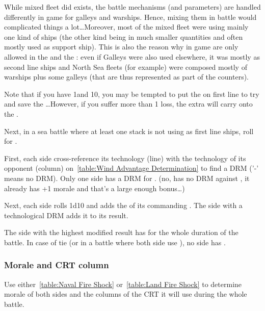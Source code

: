\begin{designnote}
  While mixed fleet did exists, the battle mechanisms (and parameters) are
  handled differently in game for galleys and warships. Hence, mixing them in
  battle would complicated things a lot\ldots Moreover, most of the mixed
  fleet were using mainly one kind of ships (the other kind being in much
  smaller quantities and often mostly used as support ship). This is also the
  reason why in game \NGD are only allowed in the  and
  the : even if Galleys were also used elsewhere, it was
  mostly as second line ships and North Sea fleets (for example) were composed
  mostly of warships plus some galleys (that are thus represented as part of
  the counters).

  \smallskip

  Note that if you have 1\NWD and 10\NGD, you may be tempted to put the \NWD
  on first line to try and save the \NGD\ldots However, if you suffer more
  than 1 loss, the extra will carry onto the \NGD.
\end{designnote}

Next, in a sea battle where at least one stack is not using \NGD as first line
ships, roll for .


First, each side cross-reference its technology (line) with the technology of
its opponent (column) on~\ref{table:Wind Advantage Determination} to find a
DRM ('-' means no DRM). Only one side has a DRM for .
(no, \TBAT has no DRM against \TGF, it already has +1 morale and that's a
large enough bonus\ldots)

Next, each side rolls 1d10 and adds the \Man of its commanding \LeaderA. The
side with a technological DRM adds it to its result.

The side with the highest modified result has  for the
whole duration of the battle. In case of tie (or in a battle where both side
use \NGD), no side has .

\subsubsection{Morale and CRT column}
\label{chMilitary:Battle:Parameters:CRT}
Use either~\ref{table:Naval Fire Shock} or~\ref{table:Land Fire Shock} to
determine morale of both sides and the columns of the CRT it will use during
the whole battle.

